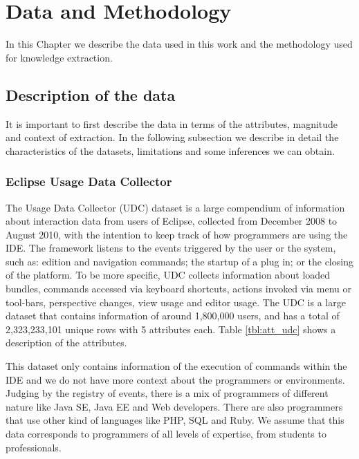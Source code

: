 \chapter{Data and Methodology}
In this Chapter we describe the data used in this work and the methodology used for knowledge extraction.

\section{Description of the data}
It is important to first describe the data in terms of the attributes, magnitude and context of extraction. In the following subsection we describe in detail the characteristics of the datasets, limitations and some inferences we can obtain.

\subsection{Eclipse Usage Data Collector}
The Usage Data Collector (UDC) dataset is a large compendium of information about interaction data from users of Eclipse, collected from December 2008 to August 2010, with the intention to keep track of how programmers are using the IDE. The framework listens to the events triggered by the user or the system, such as: edition and navigation commands; the startup of a plug in; or the closing of the platform. To be more specific, UDC collects information about loaded bundles, commands accessed via keyboard shortcuts, actions invoked via menu or tool-bars, perspective changes, view usage and editor usage. The UDC is a large dataset that contains information of around 1,800,000 users, and has a total of 2,323,233,101 unique rows with 5 attributes each. Table \ref{tbl:att_udc} shows a description of the attributes.

This dataset only contains information of the execution of commands within the IDE and we do not have more context about the programmers or environments. Judging by the registry of events, there is a mix of programmers of different nature like Java SE, Java EE and Web developers. There are also programmers that use other kind of languages like PHP, SQL and Ruby. We assume that this data corresponds to programmers of all levels of expertise, from students to professionals.


